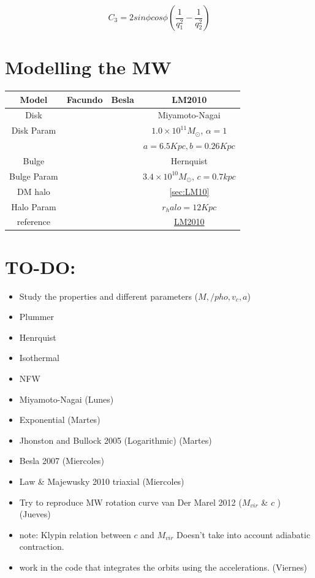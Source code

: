 \documentclass[a4paper, 12pt]{article} %
\begin{document}
\begin{equation}
C_3 = 2 sin \phi cos\phi \left( \dfrac{1}{q_1^2} - \dfrac{1}{q_2^2} \right)
\end{equation}

\section{Modelling the MW}

\begin{table}[H]
\begin{center}
\begin{tabular}{c c c c }
\hline 
Model  & Facundo  & Besla & LM2010  \\
\hline
Disk  &     &   & Miyamoto-Nagai  \\
Disk Param & & & $1.0 \times 10^{11}M_{\odot}$, $\alpha=1$ \\
 & & & $a=6.5 Kpc, b=0.26Kpc$\\
Bulge & & & Hernquist\\
Bulge Param & & & $3.4 \times 10^{10}M_{\odot}$, $c=0.7kpc$ \\
DM halo & & & \ref{sec:LM10}  \\
Halo Param & & & $r_halo = 12 Kpc$\\
reference & & & \href{http://bit.ly/1fXtla9}{LM2010} \\
\hline
\end{tabular}
\end{center}
\end{table}

\section{TO-DO:}

\begin{itemize}

\item Study the properties and different parameters ($M, /pho, v_c, a$)

\item Plummer
\item Henrquist
\item Isothermal
\item NFW
\item Miyamoto-Nagai (Lunes)
\item Exponential (Martes)
\item Jhonston and Bullock 2005 (Logarithmic) (Martes)
\item Besla 2007 (Miercoles)
\item Law \& Majewusky 2010 triaxial (Miercoles)

\item Try to reproduce MW rotation curve van Der Marel 2012 ($M_{vir}$ \& $c$ ) (Jueves)


\item note: Klypin relation between $c$ and $M_{vir}$ Doesn't take into 
account adiabatic contraction. 

\item work in the code that integrates the orbits using the accelerations. (Viernes)

\end{itemize}



\end{document}

